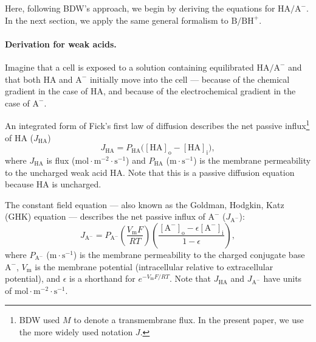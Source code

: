 \documentclass[fleqn,10pt]{physiome}
\begin{document}
Here, following BDW's approach, we begin by deriving the equations for $\mathrm{HA}/\mathrm{A^-}$. In the next section, we apply the same general formalism to $\mathrm{B}/\mathrm{BH^+}$.

\paragraph{Derivation for weak acids.}

Imagine that a cell is exposed to a solution containing equilibrated $\mathrm{HA}/\mathrm{A^-}$ and that both $\mathrm{HA}$ and $\mathrm{A^-}$ initially move into the cell --- because of the chemical gradient in the case of $\mathrm{HA}$, and because of the electrochemical gradient in the case of $\mathrm{A^-}$.

An integrated form of Fick's first law of diffusion describes the net passive influx\footnote{BDW used $M$ to denote a transmembrane flux. In the present paper, we use the more widely used notation $J$.} of $\mathrm{HA}$ ($J_\mathrm{HA}$)
\begin{equation}
J_\mathrm{HA}=P_\mathrm{HA}\bigg(\mathrm{[HA]_o}-\mathrm{[HA]_i}\bigg),
\label{eqn:J_HA}
\end{equation}
where $J_\mathrm{HA}$ is flux ($\mathrm{mol\cdot m^{-2}\cdot s^{-1}}$) and $P_\mathrm{HA}$ ($\mathrm{m\cdot s^{-1}}$) is the membrane permeability to the uncharged weak acid $\mathrm{HA}$. Note that this is a passive diffusion equation because $\mathrm{HA}$ is uncharged.

The constant field equation --- also known as the Goldman, Hodgkin, Katz (GHK) \citep{goldman1943potential,hodgkin1952quantitative} equation --- describes the net passive influx of $\mathrm{A^-}$ ($J_\mathrm{A^-}$):
\begin{equation}
J_\mathrm{A^-}=P_\mathrm{A^-}\left(\dfrac{V_\mathrm{m}F}{RT}\right)\left(\dfrac{\mathrm{[A^-]_o}-\epsilon\mathrm{[A^-]_i}}{1-\epsilon}\right),
\label{eqn:J_A}
\end{equation}
where $P_\mathrm{A^-}$ ($\mathrm{m\cdot s^{-1}}$) is the membrane permeability to the charged conjugate base $\mathrm{A^-}$, $V_\mathrm{m}$ is the membrane potential (intracellular relative to extracellular potential), and $\epsilon$ is a shorthand for $e^{{-V_\mathrm{m}F}/{RT}}$. Note that $J_\mathrm{HA}$ and $J_\mathrm{A^-}$ have units of $\mathrm{mol\cdot m^{-2}\cdot s^{-1}}$.
\end{document}
